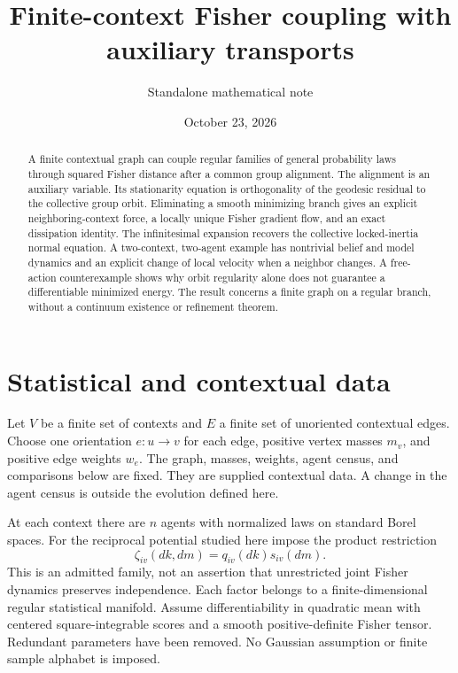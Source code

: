 \documentclass[11pt]{article}
\title{Finite-context Fisher coupling with auxiliary transports}
\author{Standalone mathematical note}
\date{October 23, 2026}
\begin{document}
\maketitle
\begin{abstract}
A finite contextual graph can couple regular families of general probability laws through squared Fisher distance after a common group alignment. The alignment is an auxiliary variable. Its stationarity equation is orthogonality of the geodesic residual to the collective group orbit. Eliminating a smooth minimizing branch gives an explicit neighboring-context force, a locally unique Fisher gradient flow, and an exact dissipation identity. The infinitesimal expansion recovers the collective locked-inertia normal equation. A two-context, two-agent example has nontrivial belief and model dynamics and an explicit change of local velocity when a neighbor changes. A free-action counterexample shows why orbit regularity alone does not guarantee a differentiable minimized energy. The result concerns a finite graph on a regular branch, without a continuum existence or refinement theorem.
\end{abstract}

\section{Statistical and contextual data}

Let $V$ be a finite set of contexts and $E$ a finite set of unoriented contextual edges. Choose one orientation $e:u\to v$ for each edge, positive vertex masses $m_v$, and positive edge weights $w_e$. The graph, masses, weights, agent census, and comparisons below are fixed. They are supplied contextual data. A change in the agent census is outside the evolution defined here.

At each context there are $n$ agents with normalized laws on standard Borel spaces. For the reciprocal potential studied here impose the product restriction
\begin{equation}
 \zeta_{iv}(dk,dm)=q_{iv}(dk)s_{iv}(dm).
 \label{eq:product}
\end{equation}
This is an admitted family, not an assertion that unrestricted joint Fisher dynamics preserves independence. Each factor belongs to a finite-dimensional regular statistical manifold. Assume differentiability in quadratic mean with centered square-integrable scores and a smooth positive-definite Fisher tensor. Redundant parameters have been removed. No Gaussian assumption or finite sample alphabet is imposed.
\end{document}
